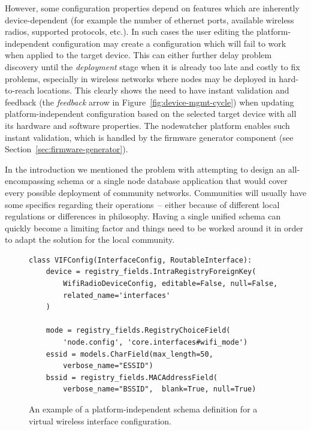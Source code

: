 \documentclass[5p,sort&compress]{elsarticle}
\begin{document}
However, some configuration properties depend on features which are inherently device-dependent (for example the number of ethernet ports, available wireless radios, supported protocols, etc.). In such cases the user editing the platform-independent configuration may create a configuration which will fail to work when applied to the target device. This can either further delay problem discovery until the \textit{deployment} stage when it is already too late and costly to fix problems, especially in wireless networks where nodes may be deployed in hard-to-reach locations. This clearly shows the need to have instant validation and feedback (the \textit{feedback} arrow in Figure~\ref{fig:device-mgmt-cycle}) when updating platform-independent configuration based on the selected target device with all its hardware and software properties. The nodewatcher platform enables such instant validation, which is handled by the firmware generator component (see Section~\ref{sec:firmware-generator}).

In the introduction we mentioned the problem with attempting to design an all-encompassing schema or a single node database application that would cover every possible deployment of community networks. Communities will usually have some specifics regarding their operations~-- either because of different local regulations or differences in philosophy. Having a single unified schema can quickly become a limiting factor and things need to be worked around it in order to adapt the solution for the local community.

\begin{figure}
\centering
\begin{verbatim}
class VIFConfig(InterfaceConfig, RoutableInterface):
    device = registry_fields.IntraRegistryForeignKey(
        WifiRadioDeviceConfig, editable=False, null=False,
        related_name='interfaces'
    )

    mode = registry_fields.RegistryChoiceField(
        'node.config', 'core.interfaces#wifi_mode')
    essid = models.CharField(max_length=50,
        verbose_name="ESSID")
    bssid = registry_fields.MACAddressField(
        verbose_name="BSSID",  blank=True, null=True)
\end{verbatim}
\caption{An example of a platform-independent schema definition for a virtual wireless interface configuration.}
\label{fig:schema-module-wifi}
\end{figure}
\end{document}
